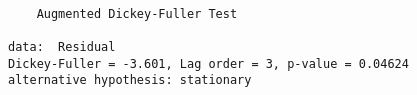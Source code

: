 \begin{verbatim} 

	Augmented Dickey-Fuller Test

data:  Residual
Dickey-Fuller = -3.601, Lag order = 3, p-value = 0.04624
alternative hypothesis: stationary

\end{verbatim}